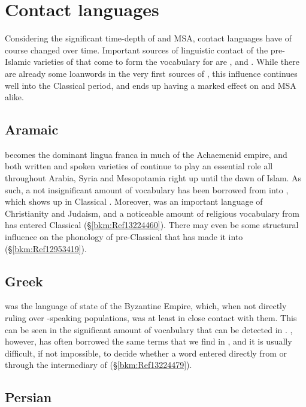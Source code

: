 \documentclass[output=paper]{langsci/langscibook}
\begin{document}
\section{Contact languages}


Considering the significant time-depth of  and MSA, contact languages have of course changed over time. Important sources of linguistic contact of the pre-Islamic varieties of  that come to form the vocabulary for  are ,  and . While there are already some  {loanwords} in the very first sources of , this influence continues well into the Classical period, and ends up having a marked effect on  and MSA alike.

\subsection{Aramaic}
 becomes the dominant lingua franca in much of the Achaemenid empire, and both written and spoken varieties of  continue to play an essential role all throughout Arabia, Syria and Mesopotamia right up until the dawn of Islam. As such, a not insignificant amount of vocabulary has been borrowed from  into , which shows up in Classical . Moreover,  was an important language of Christianity and Judaism, and a noticeable amount of religious vocabulary from  has entered Classical  (§\ref{bkm:Ref13224460}). There may even be some structural influence on the phonology of pre-Classical  that has made it into  (§\ref{bkm:Ref12953419}).

\subsection{Greek}

 was the language of state of the Byzantine Empire, which, when not directly ruling over -speaking populations, was at least in close contact with them. This can be seen in the significant amount of  vocabulary that can be detected in . , however, has often borrowed the same terms that we find in , and it is usually difficult, if not impossible, to decide whether a  word entered  directly from  or through the intermediary of  (§\ref{bkm:Ref13224479}).

\subsection{Persian}
\end{document}
